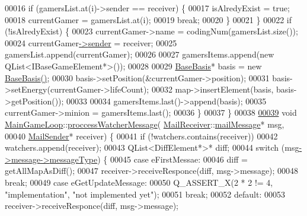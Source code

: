\begin{DoxyCode}
00016     \textcolor{keywordflow}{if} (gamersList.at(i)->sender == receiver) \{
00017       isAlredyExist = \textcolor{keyword}{true};
00018       currentGamer = gamersList.at(i);
00019       \textcolor{keywordflow}{break};
00020     \}
00021   \}
00022   \textcolor{keywordflow}{if} (!isAlredyExist) \{
00023     currentGamer->name = codingNum(gamersList.size());
00024     currentGamer\hyperlink{a00213_aebab9469416fa837ba9140f2bf2b280d}{->}\hyperlink{a00213_aebab9469416fa837ba9140f2bf2b280d}{sender} = receiver;
00025     gamersList.append(currentGamer);
00026 
00027     gamersItems.append(\textcolor{keyword}{new} QList<IBaseGameElement*>());
00028 
00029     \hyperlink{a00149}{BaseBasis}* basis = \textcolor{keyword}{new} \hyperlink{a00149}{BaseBasis}\hyperlink{a00149_aa3c0b1cd0f29db8b63bb22dbfb78bbc5}{(}\hyperlink{a00149_aa3c0b1cd0f29db8b63bb22dbfb78bbc5}{)};
00030     basis->setPosition(&currentGamer->position);
00031     basis->setEnergy(currentGamer->lifeCount);
00032     map->insertElement(basis, basis->getPosition());
00033 
00034     gamersItems.last()->append(basis);
00035     currentGamer->minion = gamersItems.last();
00036   \}
00037 \}
00038 
\hyperlink{a00209_a26ac1e61f11a51a84b6f2e770808d162}{00039} \textcolor{keywordtype}{void} \hyperlink{a00209_ac4cd47d8b350ae45ea09aaecad11a684}{MainGameLoop}::\hyperlink{a00209_a26ac1e61f11a51a84b6f2e770808d162}{proccessWatcherMessage}(
      \hyperlink{a00197_ace6950e3788bb037f23ce8668ef83829}{MailReceiver}::\hyperlink{a00201}{mailMessage}* msg,
00040                                           \hyperlink{a00205}{MailSender}* receiver) \{
00041   \textcolor{keywordflow}{if} (!watchers.contains(receiver))
00042     watchers.append(receiver);
00043   QList<DiffElement*>* diff;
00044   \textcolor{keywordflow}{switch} (msg\hyperlink{a00201_aa5878557546468fcfb65e099a5d4bf7d}{->}\hyperlink{a00201_aa5878557546468fcfb65e099a5d4bf7d}{message}\hyperlink{a00121_a77e3d9ee30093b40db7f2d8f5d7590aa}{->}\hyperlink{a00121_a77e3d9ee30093b40db7f2d8f5d7590aa}{messageType}) \{
00045     \textcolor{keywordflow}{case} eFirstMessae:
00046       diff = getAllMapAsDiff();
00047       receiver->receiveResponce(diff, msg->message);
00048       \textcolor{keywordflow}{break};
00049     \textcolor{keywordflow}{case} eGetUpdateMessage:
00050       Q\_ASSERT\_X(2 * 2 != 4, \textcolor{stringliteral}{"implementation"}, \textcolor{stringliteral}{"not implemented yet"});
00051       \textcolor{keywordflow}{break};
00052     \textcolor{keywordflow}{default}:
00053       receiver->receiveResponce(diff, msg->message);

\end{DoxyCode}
